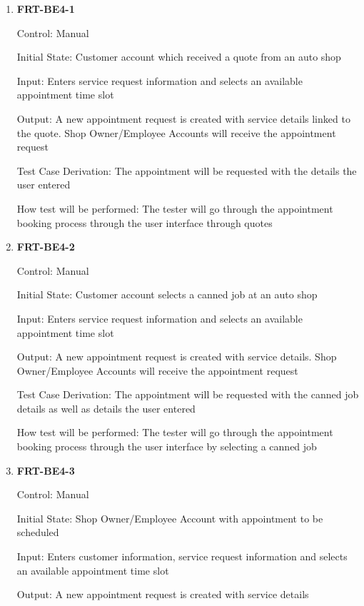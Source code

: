 \documentclass[12pt, titlepage]{article}
\begin{document}
\begin{enumerate}

	\item \textbf{FRT-BE4-1}

	      Control: Manual

	      Initial State: Customer account which received a quote from an auto shop

	      Input: Enters service request information and selects an available appointment time slot

	      Output: A new appointment request is created with service details linked to the quote. Shop
	      Owner/Employee Accounts will receive the appointment request

	      Test Case Derivation: The appointment will be requested with the details the user entered

	      How test will be performed: The tester will go through the appointment booking process through the
	      user interface through quotes

	\item \textbf{FRT-BE4-2}

	      Control: Manual

	      Initial State: Customer account selects a canned job at an auto shop

	      Input: Enters service request information and selects an available appointment time slot

	      Output: A new appointment request is created with service details. Shop Owner/Employee Accounts
	      will receive the appointment request

	      Test Case Derivation: The appointment will be requested with the canned job details as well as
	      details the user entered

	      How test will be performed: The tester will go through the appointment booking process through the
	      user interface by selecting a canned job

	\item \textbf{FRT-BE4-3}

	      Control: Manual

	      Initial State: Shop Owner/Employee Account with appointment to be scheduled

	      Input: Enters customer information, service request information and selects an available
	      appointment time slot

	      Output: A new appointment request is created with service details


\end{enumerate}
\end{document}
